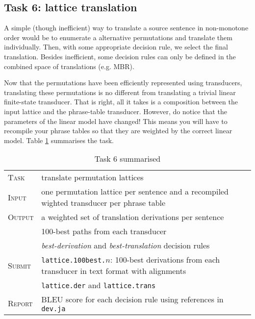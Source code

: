 \subsection{Task 6: lattice translation}

A simple (though inefficient) way to translate a source sentence in non-monotone order would be to enumerate a alternative permutations and translate them individually.
Then, with some appropriate decision rule, we select the final translation.
Besides inefficient, some decision rules can only be defined in the combined space of translations (e.g. MBR).

Now that the permutations have been efficiently represented using transducers, translating these permutations is no different from translating a trivial linear finite-state transducer.
That is right, all it takes is a composition between the input lattice and the phrase-table transducer.
However, do notice that the parameters of the linear model have changed! This means you will have to recompile your phrase tables so that they are weighted by the correct linear model.
Table \ref{tab:task6} summarises the task. 

\begin{table}[h]\centering
\begin{tabular}{l p{12cm}}
\textsc{Task}   &  translate permutation lattices\\
\textsc{Input}  &  one permutation lattice per sentence and a recompiled wighted transducer per phrase table\\
\textsc{Output} &  a weighted set of translation derivations per sentence\\
                &  100-best paths from each transducer \\
                & \emph{best-derivation} and \emph{best-translation} decision rules\\
\textsc{Submit} & \texttt{lattice.100best.}$n$: 100-best derivations from each transducer in text format with alignments\\
                & \texttt{lattice.der} and \texttt{lattice.trans} \\  
\textsc{Report} & BLEU score for each decision rule using references in \texttt{dev.ja}\\
\end{tabular}
\caption{\label{tab:task6}Task 6 summarised}
\end{table}

